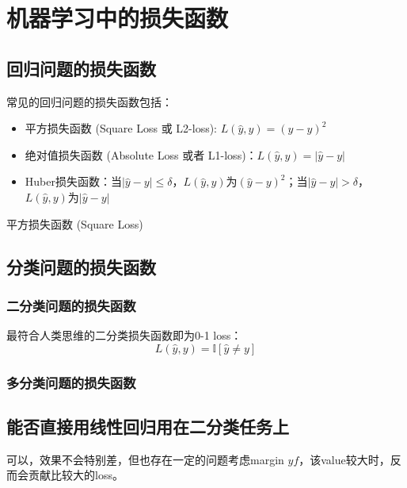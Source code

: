\chapter{机器学习中的损失函数}

\section{回归问题的损失函数}

常见的回归问题的损失函数包括：
\begin{itemize}
  \item 平方损失函数 (Square Loss 或 L2-loss): $L(\hat{y}, y) = (\hat{y} - y)^2$
  \item 绝对值损失函数 (Absolute Loss 或者 L1-loss)：$L(\hat{y}, y) = |\hat{y} - y|$
  \item Huber损失函数：当$|\hat{y} - y|\leq\delta$，$L(\hat{y}, y)$为$(\hat{y} - y)^2$；当$|\hat{y} - y|>\delta$，$L(\hat{y}, y)$为$|\hat{y} - y|$
\end{itemize}


平方损失函数 (Square Loss)

\section{分类问题的损失函数}

\subsection{二分类问题的损失函数}

最符合人类思维的二分类损失函数即为0-1 loss：
\begin{equation}
  L(\hat{y}, y) = \mathbb{I}[\hat{y} \neq y]
\end{equation}

\subsection{多分类问题的损失函数}

\section{能否直接用线性回归用在二分类任务上}

可以，效果不会特别差，但也存在一定的问题考虑margin $yf$，该value较大时，反而会贡献比较大的loss。
